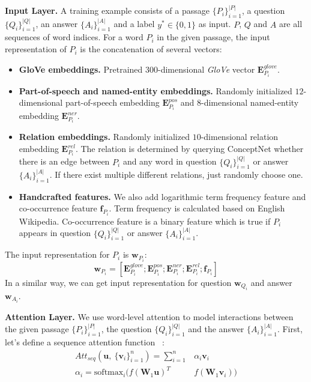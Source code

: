 \documentclass[11pt,a4paper]{article}
\begin{document}
\noindent
\textbf{Input Layer. }
A training example consists of a passage $\{P_i\}_{i=1}^{|P|}$,
a question $\{Q_i\}_{i=1}^{|Q|}$,
an answer $\{A_i\}_{i=1}^{|A|}$ and a label $y^* \in \{0, 1\}$ as input.
$P$, $Q$ and $A$ are all sequences of word indices.
For a word $P_i$ in the given passage,
the input representation of $P_i$ is the concatenation of several vectors:
\begin{itemize}
\setlength\itemsep{0em}
\item \textbf{GloVe embeddings.}
Pretrained $300$-dimensional \emph{GloVe} vector $\mathbf{E}_{P_i}^{glove}$.
\item \textbf{Part-of-speech and named-entity embeddings.}
Randomly initialized $12$-dimensional part-of-speech embedding $\mathbf{E}_{P_i}^{pos}$
and $8$-dimensional named-entity embedding $\mathbf{E}_{P_i}^{ner}$.
\item \textbf{Relation embeddings.}
Randomly initialized $10$-dimensional relation embedding $\mathbf{E}_{P_i}^{rel}$.
The relation is determined by querying ConceptNet
whether there is an edge between $P_i$ and
any word in question $\{Q_i\}_{i=1}^{|Q|}$ or answer $\{A_i\}_{i=1}^{|A|}$.
If there exist multiple different relations,
just randomly choose one.
\item \textbf{Handcrafted features.}
We also add logarithmic term frequency feature and co-occurrence feature $\mathbf{f}_{P_i}$.
Term frequency is calculated based on English Wikipedia.
Co-occurrence feature is a binary feature which is true
if $P_i$ appears in question $\{Q_i\}_{i=1}^{|Q|}$ or answer $\{A_i\}_{i=1}^{|A|}$.
\end{itemize}
The input representation for $P_i$ is $\mathbf{w}_{P_i}$:
\begin{equation}
\mathbf{w}_{P_i} = [\mathbf{E}_{P_i}^{glove}; \mathbf{E}_{P_i}^{pos}; \mathbf{E}_{P_i}^{ner}; \mathbf{E}_{P_i}^{rel}; \mathbf{f}_{P_i}]
\end{equation}
In a similar way,
we can get input representation for question $\mathbf{w}_{Q_i}$ and answer $\mathbf{w}_{A_i}$.

\noindent
\textbf{Attention Layer. }
We use word-level attention to model interactions between the given passage $\{P_i\}_{i=1}^{|P|}$,
the question $\{Q_i\}_{i=1}^{|Q|}$ and the answer $\{A_i\}_{i=1}^{|A|}$.
First,
let's define a sequence attention function ~\cite{chen2017reading}:
\begin{equation}
\begin{aligned}
Att_{seq}(\mathbf{u},\ \{\mathbf{v}_i\}_{i=1}^{n}) = \sum_{i=1}^{n}&{\alpha_i \mathbf{v}_i} \\
\alpha_i = \mathrm{softmax}_i(f(\mathbf{W}_1\mathbf{u})^T & f(\mathbf{W}_1\mathbf{v}_i))
\end{aligned}
\end{equation}
\end{document}
